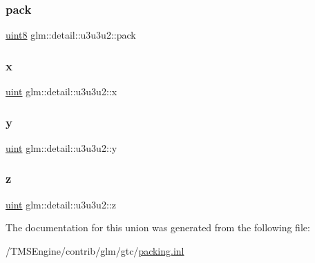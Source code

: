 \mbox{\label{unionglm_1_1detail_1_1u3u3u2_aea48c2c7d1d3283f3c785daa33551351}} 
\subsubsection{\texorpdfstring{pack}{pack}}
{\footnotesize\ttfamily \hyperlink{namespaceglm_1_1detail_aef2588f97d090cc19fbbe0c74fe17c8f}{uint8} glm\+::detail\+::u3u3u2\+::pack}

\mbox{\label{unionglm_1_1detail_1_1u3u3u2_aaa6af1d1bd34a7e72c0d7b1bb622a4da}} 
\subsubsection{\texorpdfstring{x}{x}}
{\footnotesize\ttfamily \hyperlink{group__core__precision_ga4fd29415871152bfb5abd588334147c8}{uint} glm\+::detail\+::u3u3u2\+::x}

\mbox{\label{unionglm_1_1detail_1_1u3u3u2_a2139299d7ae9d48a986ddd3edff8d669}} 
\subsubsection{\texorpdfstring{y}{y}}
{\footnotesize\ttfamily \hyperlink{group__core__precision_ga4fd29415871152bfb5abd588334147c8}{uint} glm\+::detail\+::u3u3u2\+::y}

\mbox{\label{unionglm_1_1detail_1_1u3u3u2_a53e88031a04c880792dd6e36f8e96f9a}} 
\subsubsection{\texorpdfstring{z}{z}}
{\footnotesize\ttfamily \hyperlink{group__core__precision_ga4fd29415871152bfb5abd588334147c8}{uint} glm\+::detail\+::u3u3u2\+::z}



The documentation for this union was generated from the following file\+:\begin{DoxyCompactItemize}
\item 
/\+T\+M\+S\+Engine/contrib/glm/gtc/\hyperlink{packing_8inl}{packing.\+inl}\end{DoxyCompactItemize}
